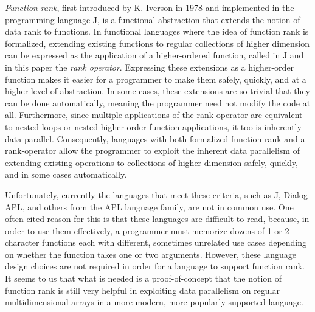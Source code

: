 \textit{Function rank}, first introduced by K. Iverson in 1978\cite{opandfunc} and implemented in the programming language J, is a functional abstraction that extends the notion of data rank to functions. %
In functional languages where the idea of function rank is formalized, extending existing functions to regular collections of higher dimension can be expressed as the application of a higher-ordered function, 
called in J and in this paper the \textit{rank operator}. %
Expressing these extensions as a higher-order function makes it easier for a programmer to make them safely, quickly, and at a higher level of abstraction.
In some cases, these extensions are so trivial that they can be done automatically, meaning the programmer need not modify the code at all. %
Furthermore, since multiple applications of the rank operator are equivalent to nested loops or nested higher-order function applications, it too is inherently data parallel.
Consequently, languages with both formalized function rank and a rank-operator allow the programmer to 
exploit the inherent data parallelism of extending existing operations to collections of higher dimension safely, quickly, and in some cases automatically.

Unfortunately, currently the languages that meet these criteria, such as J, Dialog APL, and others from the APL language family, are not in common use.
One often-cited reason for this is that these languages are difficult to read, %
because, in order to use them effectively, a programmer must memorize dozens of 1 or 2 character functions each with different, sometimes unrelated use cases depending on whether the function takes one or two arguments. %
However, these language design choices are not required in order for a language to support function rank.
It seems to us that what is needed is a proof-of-concept that the notion of function rank is still very helpful in exploiting data parallelism on regular multidimensional arrays in a more modern, more popularly supported language.


